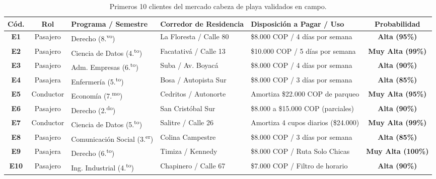 \documentclass[11pt,a4paper]{article}
\begin{document}
\begin{table}[!htbp]
\centering
\scriptsize
\setlength{\tabcolsep}{3.5pt}
\renewcommand{\arraystretch}{1.2}
\begin{tabularx}{\textwidth}{cclp{2.6cm}p{2.6cm}c}
\toprule
\textbf{C\'od.} & \textbf{Rol} & \textbf{Programa / Semestre} & \textbf{Corredor de Residencia} & \textbf{Disposici\'on a Pagar / Uso} & \textbf{Probabilidad} \\
\midrule
\textbf{E1} & Pasajero & Derecho (8.\textsuperscript{vo}) & La Floresta / Calle 80 & \$8.000 COP / 4 d\'ias por semana & \textbf{Alta (95\%)} \\
\textbf{E2} & Pasajero & Ciencia de Datos (4.\textsuperscript{to}) & Facatativ\'a / Calle 13 & \$10.000 COP / 5 d\'ias por semana & \textbf{Muy Alta (99\%)} \\
\textbf{E3} & Pasajero & Adm. Empresas (6.\textsuperscript{to}) & Suba / Av. Boyac\'a & \$8.000 COP / 4 d\'ias por semana & \textbf{Alta (90\%)} \\
\textbf{E4} & Pasajera & Enfermer\'ia (5.\textsuperscript{to}) & Bosa / Autopista Sur & \$8.000 COP / 3 d\'ias por semana & \textbf{Alta (85\%)} \\
\textbf{E5} & Conductor & Econom\'ia (7.\textsuperscript{mo}) & Cedritos / Autonorte & Amortiza \$22.000 COP de parqueo & \textbf{Muy Alta (95\%)} \\
\textbf{E6} & Pasajero & Derecho (2.\textsuperscript{do}) & San Crist\'obal Sur & \$8.000 a \$15.000 COP (parciales) & \textbf{Alta (90\%)} \\
\textbf{E7} & Conductor & Ciencia de Datos (5.\textsuperscript{to}) & Salitre / Calle 26 & Amortiza 4 cupos diarios (\$24.000) & \textbf{Muy Alta (99\%)} \\
\textbf{E8} & Pasajero & Comunicaci\'on Social (3.\textsuperscript{er}) & Colina Campestre & \$8.000 COP / 3 d\'ias por semana & \textbf{Alta (85\%)} \\
\textbf{E9} & Pasajera & Derecho (6.\textsuperscript{to}) & Timiza / Kennedy & \$8.000 COP / Ruta Solo Chicas & \textbf{Muy Alta (100\%)} \\
\textbf{E10} & Pasajero & Ing. Industrial (4.\textsuperscript{to}) & Chapinero / Calle 67 & \$7.000 COP / Filtro de horario & \textbf{Alta (90\%)} \\
\bottomrule
\end{tabularx}
\caption{Primeros 10 clientes del mercado cabeza de playa validados en campo.}
\label{tab:primeros10}
\end{table}
\end{document}
